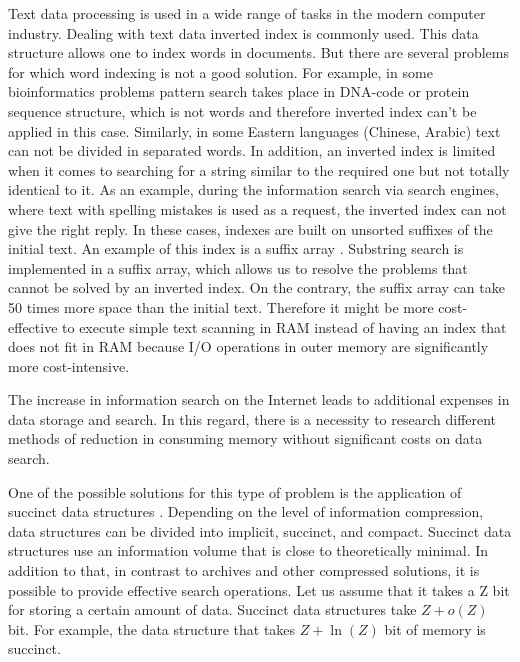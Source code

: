 

Text data processing is used in a wide range of tasks in the modern computer industry.
Dealing with text data inverted index \cite{zobel2006inverted} is commonly used. This data structure
allows one to index words in documents.
But there are several problems for which word indexing is not a good solution.
For example, in some bioinformatics problems \cite{tsuruoka2008facta} pattern search takes place
in DNA-code or protein sequence structure, which is not words and therefore inverted index
can't be applied in this case.
Similarly, in some Eastern languages (Chinese, Arabic) text can not be divided in separated words.
In addition, an inverted index is limited when it comes to searching for a string similar to the required
one but not totally identical to it. As an example, during the information search via search engines,
where text with spelling mistakes is used as a request, the inverted index can not give the right reply.
In these cases, indexes are built on unsorted suffixes of the initial text.
An example of this index is a suffix array \cite{manber1993suffix}.
Substring search is implemented in a suffix array, which allows us to resolve the problems
that cannot be solved by an inverted index.
On the contrary, the suffix array can take 50 times more space than the initial text.
Therefore it might be more cost-effective to execute simple text scanning in RAM 
instead of having an index that does not fit in RAM
because I/O operations in outer memory are significantly more cost-intensive.

The increase in information search on the Internet leads to additional expenses in data storage and search.
In this regard, there is a necessity to research different methods of reduction in consuming memory without 
significant costs on data search.

One of the possible solutions for this type of problem is the application
of succinct data structures \cite{jacobson1988succinct}.
Depending on the level of information compression, data structures can be divided into implicit, succinct, and compact.
Succinct data structures use an information volume that is close to theoretically minimal.
In addition to that, in contrast to archives and other compressed solutions, 
it is possible to provide effective search operations.
Let us assume that it takes a Z bit for storing a certain amount of data.
Succinct data structures take \(Z + o(Z)\) bit. 
For example, the data structure that takes \(Z + \ln(Z)\) bit of memory is succinct.

